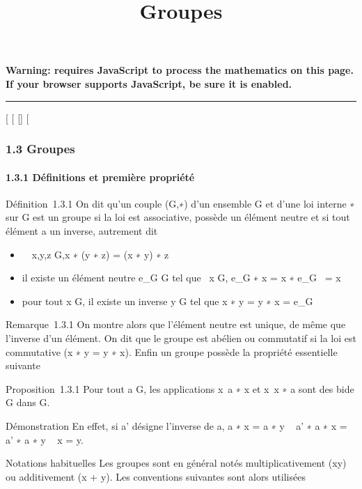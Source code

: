 \documentclass[]{article}
\title{Groupes}
\author{}
\date{}
\begin{document}
\maketitle

\textbf{Warning: 
requires JavaScript to process the mathematics on this page.\\ If your
browser supports JavaScript, be sure it is enabled.}

\begin{center}\rule{3in}{0.4pt}\end{center}

{[}
{[}
{[}{]}
{[}

\subsubsection{1.3 Groupes}

\paragraph{1.3.1 Définitions et première propriété}

Définition~1.3.1 On dit qu'un couple (G,∗) d'un ensemble G et d'une loi
interne ∗ sur G est un groupe si la loi est associative, possède un
élément neutre et si tout élément a un inverse, autrement dit

\begin{itemize}
\itemsep1pt\parskip0pt
\item
  \forall~~x,y,z \in G,x ∗ (y ∗ z) = (x ∗ y) ∗ z
\item
  il existe un élément neutre e\_G \in G tel que
  \forall~x \in G, e\_G ∗ x = x ∗ e\_G~
  = x
\item
  pour tout x \in G, il existe un inverse y \in G tel que x ∗ y = y ∗ x =
  e\_G
\end{itemize}

Remarque~1.3.1 On montre alors que l'élément neutre est unique, de même
que l'inverse d'un élément. On dit que le groupe est abélien ou
commutatif si la loi est commutative (x ∗ y = y ∗ x). Enfin un groupe
possède la propriété essentielle suivante

Proposition~1.3.1 Pour tout a \in G, les applications
x\mapsto~a ∗ x et x\mathrel\mapsto~x ∗ a
sont des bi\jmathections de G dans G.

Démonstration En effet, si a' désigne l'inverse de a, a ∗ x = a ∗ y \rigtharrow~ a'
∗ a ∗ x = a' ∗ a ∗ y \rigtharrow~ x = y.

Notations habituelles Les groupes sont en général notés
multiplicativement (xy) ou additivement (x + y). Les conventions
suivantes sont alors utilisées
\end{document}
